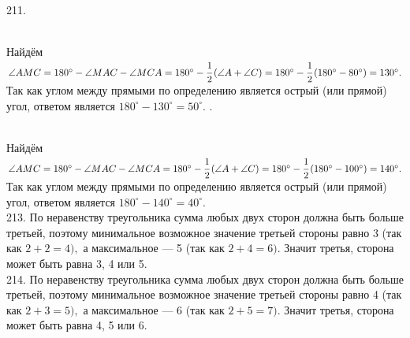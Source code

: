 \documentclass[12pt]{article}
\begin{document}
211. \begin{figure}[ht!]
\end{figure}\\
Найдём $\angle AMC=180^\circ-\angle MAC-\angle MCA=180^\circ-\cfrac{1}{2}\left(\angle A +\angle C\right)=180^\circ-\cfrac{1}{2}\left(180^\circ-80^\circ\right)=130^\circ.$ Так как углом между прямыми по определению является острый (или прямой) угол, ответом является $180^\circ-130^\circ=50^\circ.$
\newpage{}. \begin{figure}[ht!]
\end{figure}\\
Найдём $\angle AMC=180^\circ-\angle MAC-\angle MCA=180^\circ-\cfrac{1}{2}\left(\angle A +\angle C\right)=180^\circ-\cfrac{1}{2}\left(180^\circ-100^\circ\right)=140^\circ.$ Так как углом между прямыми по определению является острый (или прямой) угол, ответом является $180^\circ-140^\circ=40^\circ.$\\
213. По неравенству треугольника сумма любых двух сторон должна быть больше третьей, поэтому минимальное возможное значение третьей стороны равно 3 (так как $2+2=4),$ а максимальное --- 5 (так как $2+4=6).$ Значит третья, сторона может быть равна 3, 4 или 5.\\
214. По неравенству треугольника сумма любых двух сторон должна быть больше третьей, поэтому минимальное возможное значение третьей стороны равно 4 (так как $2+3=5),$ а максимальное --- 6 (так как $2+5=7).$ Значит третья, сторона может быть равна 4, 5 или 6.\\
\end{document}
